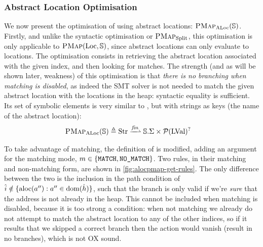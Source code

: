 \subsubsection{Abstract Location Optimisation}

We now present the optimisation of \PMap{} using abstract locations: $\textsc{PMap}_{\text{ALoc}}(\mathbb S)$. Firstly, and unlike the syntactic optimisation or $\textsc{PMap}_{\text{Split}}$, this optimisation is only applicable to $\textsc{PMap}(\text{Loc},\mathbb S)$, since abstract locations can only evaluate to locations. The optimisation consists in retrieving the abstract location associated with the given index, and then looking for matches. The strength (and as will be shown later, weakness) of this optimisation is that \emph{there is no branching when matching is disabled}, as indeed the SMT solver is not needed to match the given abstract location with the locations in the heap: syntactic equality is sufficient. Its set of symbolic elements is very similar to \PMap, but with strings as keys (the name of the abstract location): \begin{align*}
	\ALocPMap(\mmdl) &\defeq \Str \finmap \mmdl.\Sigma \times \pset(\LVal)^?
\end{align*}

To take advantage of matching, the definition of  is modified, adding an argument for the matching mode, $m\in\{\texttt{MATCH},\texttt{NO\_MATCH}\}$. Two rules, in their matching and non-matching form, are shown in \autoref{fig:alocpmap-get-rules}. The only difference between the two is the inclusion in the path condition of ${\hat{i}\notin\{\text{aloc}(a''):a''\in \operatorname{dom}(\hat{h})\}}$, such that the branch is only valid if we're \emph{sure} that the address is not already in the heap. This cannot be included when matching is disabled, because it is too strong a condition: when not matching we already do not attempt to match the abstract location to any of the other indices, so if it results that we skipped a correct branch then the action would vanish (result in no branches), which is not OX sound.

